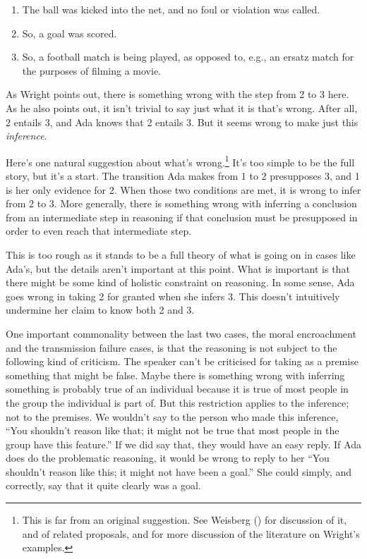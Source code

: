 \documentclass[
  10pt,
  letterpaper,
  twoside]{scrbook}
\providecommand{\tightlist}{%
  \setlength{\itemsep}{0pt}\setlength{\parskip}{0pt}}\usepackage{longtable,booktabs,array}
\begin{document}
\begin{enumerate}
\def\labelenumi{\arabic{enumi}.}
\tightlist
\item
  The ball was kicked into the net, and no foul or violation was called.
\item
  So, a goal was scored.
\item
  So, a football match is being played, as opposed to, e.g., an ersatz
  match for the purposes of filming a movie.
\end{enumerate}

As Wright points out, there is something wrong with the step from 2 to 3
here. As he also points out, it isn't trivial to say just what it is
that's wrong. After all, 2 entails 3, and Ada knows that 2 entails 3.
But it seems wrong to make just this \emph{inference}.

Here's one natural suggestion about what's wrong.\footnote{This is far
  from an original suggestion. See Weisberg
  () for discussion of it, and of
  related proposals, and for more discussion of the literature on
  Wright's examples.} It's too simple to be the full story, but it's a
start. The transition Ada makes from 1 to 2 presupposes 3, and 1 is her
only evidence for 2. When those two conditions are met, it is wrong to
infer from 2 to 3. More generally, there is something wrong with
inferring a conclusion from an intermediate step in reasoning if that
conclusion must be presupposed in order to even reach that intermediate
step.

This is too rough as it stands to be a full theory of what is going on
in cases like Ada's, but the details aren't important at this point.
What is important is that there might be some kind of holistic
constraint on reasoning. In some sense, Ada goes wrong in taking 2 for
granted when she infers 3. This doesn't intuitively undermine her claim
to know both 2 and 3.

One important commonality between the last two cases, the moral
encroachment and the transmission failure cases, is that the reasoning
is not subject to the following kind of criticism. The speaker can't be
criticised for taking as a premise something that might be false. Maybe
there is something wrong with inferring something is probably true of an
individual because it is true of most people in the group the individual
is part of. But this restriction applies to the inference; not to the
premises. We wouldn't say to the person who made this inference, ``You
shouldn't reason like that; it might not be true that most people in the
group have this feature.'' If we did say that, they would have an easy
reply. If Ada does do the problematic reasoning, it would be wrong to
reply to her ``You shouldn't reason like this; it might not have been a
goal.'' She could simply, and correctly, say that it quite clearly was a
goal.
\end{document}
